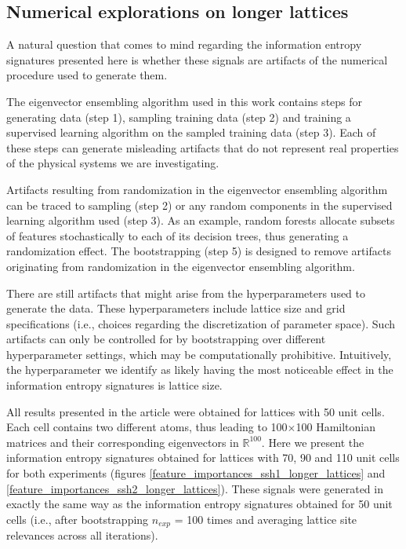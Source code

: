 \documentclass[10pt]{revtex4-1}
\begin{document}
\subsection*{Numerical explorations on longer lattices}

A natural question that comes to mind regarding the information entropy signatures presented here is whether these signals are artifacts of the numerical procedure used to generate them.

The eigenvector ensembling algorithm used in this work contains steps for generating data (step 1), sampling training data (step 2) and training a supervised learning algorithm on the sampled training data (step 3). Each of these steps can generate misleading artifacts that do not represent real properties of the physical systems we are investigating.

Artifacts resulting from randomization in the eigenvector ensembling algorithm can be traced to sampling (step 2) or any random components in the supervised learning algorithm used (step 3). As an example, random forests allocate subsets of features stochastically to each of its decision trees, thus generating a randomization effect. The bootstrapping (step 5) is designed to remove artifacts originating from randomization in the eigenvector ensembling algorithm.

There are still artifacts that might arise from the hyperparameters used to generate the data. These hyperparameters include lattice size and grid specifications (i.e., choices regarding the discretization of parameter space). Such artifacts can only be controlled for by bootstrapping over different hyperparameter settings, which may be computationally prohibitive. Intuitively, the hyperparameter we identify as likely having the most noticeable effect in the information entropy signatures is lattice size.

All results presented in the article were obtained for lattices with 50 unit cells. Each cell contains two different atoms, thus leading to 100$\times$100 Hamiltonian matrices and their corresponding eigenvectors in $\mathbb{R}^{100}$. Here we present the information entropy signatures obtained for lattices with 70, 90 and 110 unit cells for both experiments (figures \ref{feature_importances_ssh1_longer_lattices} and \ref{feature_importances_ssh2_longer_lattices}). These signals were generated in exactly the same way as the information entropy signatures obtained for 50 unit cells (i.e., after bootstrapping $n_{exp}$ = 100 times and averaging lattice site relevances across all iterations).
\end{document}
